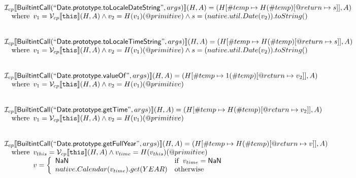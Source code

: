 \[\begin{array}{l}
\mathcal{I} _{cp}\llbracket \mbox{\textsf{BuiltintCall}}(``\mbox{\textsf{Date.prototype.toLocaleDateString}}",args)\rrbracket(H,A)
  = (H[\#temp \mapsto H(\#temp)[@return \mapsto s]], A)\\
\quad{\rm where}\begin{array}[t]{l}
  v_1 = \mathcal{V} _{cp}\llbracket \mbox{\texttt{this}}\rrbracket (H,A) \land v_2 = H(v_1)(@primitive)
  \land s = (native.util.Date(v_2)).toString()
  \end{array}\\
\\\\


\mathcal{I} _{cp}\llbracket \mbox{\textsf{BuiltintCall}}(``\mbox{\textsf{Date.prototype.toLocaleTimeString}}",args)\rrbracket(H,A)
  = (H[\#temp \mapsto H(\#temp)[@return \mapsto s]], A)\\
\quad{\rm where}\begin{array}[t]{l}
  v_1 = \mathcal{V} _{cp}\llbracket \mbox{\texttt{this}}\rrbracket (H,A) \land v_2 = H(v_1)(@primitive)
  \land s = (native.util.Date(v_2)).toString()
  \end{array}\\
\\\\


\mathcal{I} _{cp}\llbracket \mbox{\textsf{BuiltintCall}}(``\mbox{\textsf{Date.prototype.valueOf}}",args)\rrbracket(H,A)
  = (H[\#temp \mapsto 1(\#temp)[@return \mapsto v_2]], A)\\
\quad{\rm where}\begin{array}[t]{l}
  v_1 = \mathcal{V} _{cp}\llbracket \mbox{\texttt{this}}\rrbracket (H,A) \land v_2 = H(v_1)(@primitive)
  \end{array}\\
\\\\


\mathcal{I} _{cp}\llbracket \mbox{\textsf{BuiltintCall}}(``\mbox{\textsf{Date.prototype.getTime}}",args)\rrbracket(H,A)
  = (H[\#temp \mapsto H(\#temp)[@return \mapsto v_2]], A)\\
\quad{\rm where}\begin{array}[t]{l}
  v_1 = \mathcal{V} _{cp}\llbracket \mbox{\texttt{this}}\rrbracket (H,A) \land v_2 = H(v_1)(@primitive)
  \end{array}\\
\\\\

\mathcal{I} _{cp}\llbracket \mbox{\textsf{BuiltintCall}}(``\mbox{\textsf{Date.prototype.getFullYear}}",args)\rrbracket(H,A)
  = (H[\#temp \mapsto H(\#temp)[@return \mapsto v]], A)\\
\quad{\rm where}\begin{array}[t]{l}
  v_{this} = \mathcal{V} _{cp}\llbracket \mbox{\texttt{this}}\rrbracket (H,A) \land v_{time} = H(v_{this})(@primitive)\\
  v = \left\{\begin{array}{ll}
    \mbox{\textsf{NaN}}  & {\rm if}\begin{array}[t]{l}v_{time} = \mbox{\textsf{NaN}}\end{array}\\
    native.Calendar(v_{time}).get(YEAR) & {\rm otherwise}
    \end{array}\right.
  \end{array}\\
\\\\


\end{array}\]

